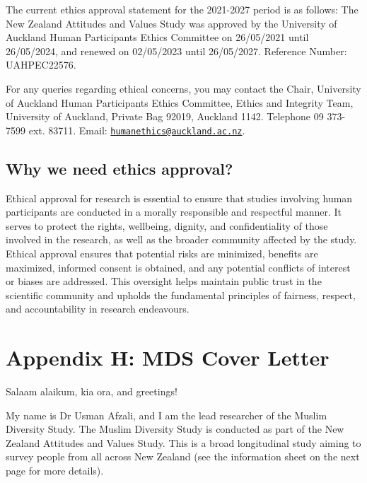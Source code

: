 \documentclass[
]{interact}
\begin{document}
\noindent The current ethics approval statement for the 2021-2027 period
is as follows: The New Zealand Attitudes and Values Study was approved
by the University of Auckland Human Participants Ethics Committee on
26/05/2021 until 26/05/2024, and renewed on 02/05/2023 until 26/05/2027.
Reference Number: UAHPEC22576.

\noindent For any queries regarding ethical concerns, you may contact
the Chair, University of Auckland Human Participants Ethics Committee,
Ethics and Integrity Team, University of Auckland, Private Bag 92019,
Auckland 1142. Telephone 09 373-7599 ext. 83711. Email:
\href{mailto:humanethics@auckland.ac.nz}{\nolinkurl{humanethics@auckland.ac.nz}}.

\subsection{Why we need ethics
approval?}\label{why-we-need-ethics-approval}

\noindent Ethical approval for research is essential to ensure that
studies involving human participants are conducted in a morally
responsible and respectful manner. It serves to protect the rights,
wellbeing, dignity, and confidentiality of those involved in the
research, as well as the broader community affected by the study.
Ethical approval ensures that potential risks are minimized, benefits
are maximized, informed consent is obtained, and any potential conflicts
of interest or biases are addressed. This oversight helps maintain
public trust in the scientific community and upholds the fundamental
principles of fairness, respect, and accountability in research
endeavours.

\newpage{}

\section{Appendix H: MDS Cover
Letter}\label{appendix-h-mds-cover-letter}

\noindent Salaam alaikum, kia ora, and greetings!

\noindent My name is Dr Usman Afzali, and I am the lead researcher of
the Muslim Diversity Study. The Muslim Diversity Study is conducted as
part of the New Zealand Attitudes and Values Study. This is a broad
longitudinal study aiming to survey people from all across New Zealand
(see the information sheet on the next page for more details).
\end{document}
